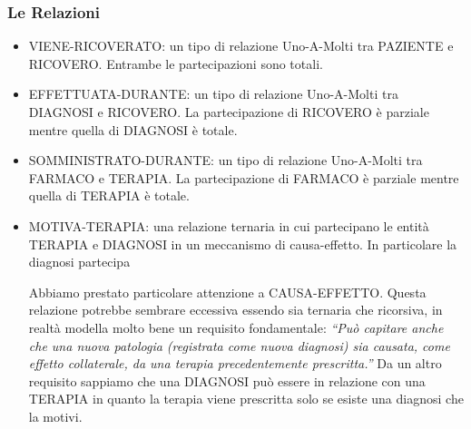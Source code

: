 \documentclass{article}
\begin{document}
\subsubsection{Le Relazioni}
    \begin{itemize}
        \item VIENE-RICOVERATO: un tipo di relazione Uno-A-Molti tra PAZIENTE e
              RICOVERO. Entrambe le partecipazioni sono totali.
        
        \item EFFETTUATA-DURANTE: un tipo di relazione Uno-A-Molti tra DIAGNOSI 
              e RICOVERO. La partecipazione di RICOVERO è parziale mentre quella
              di DIAGNOSI è totale.

        \item SOMMINISTRATO-DURANTE: un tipo di relazione Uno-A-Molti tra FARMACO
              e TERAPIA. La partecipazione di FARMACO è parziale mentre quella di
              TERAPIA è totale.
        
        \item MOTIVA-TERAPIA: una relazione ternaria in cui partecipano le entità
              TERAPIA e DIAGNOSI in un meccanismo di causa-effetto. In particolare
              la diagnosi partecipa 
        

              Abbiamo prestato particolare attenzione a CAUSA-EFFETTO.
              Questa relazione potrebbe sembrare eccessiva essendo sia ternaria che ricorsiva,
              in realtà modella molto bene un requisito fondamentale: \textit{``Può capitare
              anche che una nuova patologia (registrata come nuova diagnosi) sia causata, come
              effetto collaterale, da una terapia precedentemente prescritta.''} Da un altro
              requisito sappiamo che una DIAGNOSI può essere in relazione con una TERAPIA in
              quanto la terapia viene prescritta solo se esiste una diagnosi che la motivi.
    \end{itemize}
\end{document}
